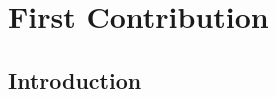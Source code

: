 \chapter{First Contribution}
\label{chapt:contribone}

\begin{intro_block}
\lipsum[1]
\end{intro_block}

\section{Introduction}

